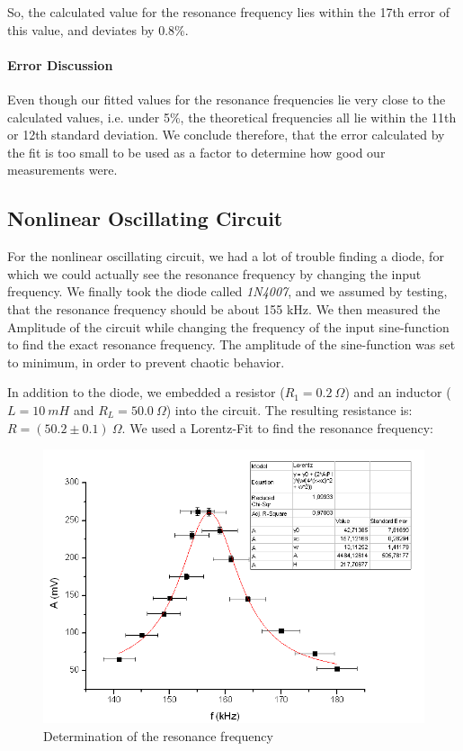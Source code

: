 So, the calculated value for the resonance frequency lies within the 17th error of this value, and deviates by 0.8\%.

\paragraph{Error Discussion}

Even though our fitted values for the resonance frequencies lie very close to the calculated values, i.e. under 5\%, the theoretical frequencies all lie within the 11th or 12th standard deviation. We conclude therefore, that the error calculated by the fit is too small to be used as a factor to determine how good our measurements were.

\subsection{Nonlinear Oscillating Circuit}

For the nonlinear oscillating circuit, we had a lot of trouble finding a diode, for which we could actually see the resonance frequency by changing the input frequency. We finally took the diode called \emph{1N4007}, and we assumed by testing, that the resonance frequency should be about 155 kHz. We then measured the Amplitude of the circuit while changing the frequency of the input sine-function to find the exact resonance frequency. The amplitude of the sine-function was set to minimum, in order to prevent chaotic behavior.

In addition to the diode, we embedded a resistor ($R_1= 0.2 \ \Omega$) and an inductor ($L=10\ mH$ and $R_L = 50.0\ \Omega$) into the circuit. The resulting resistance is: $R = (50.2 \pm 0.1)\ \Omega$. We used a Lorentz-Fit to find the resonance frequency:

\begin{figure}[H]
\centering \includegraphics[width=\textwidth]{Bilder/fresnl.png}
\caption{Determination of the resonance frequency}
\end{figure}

